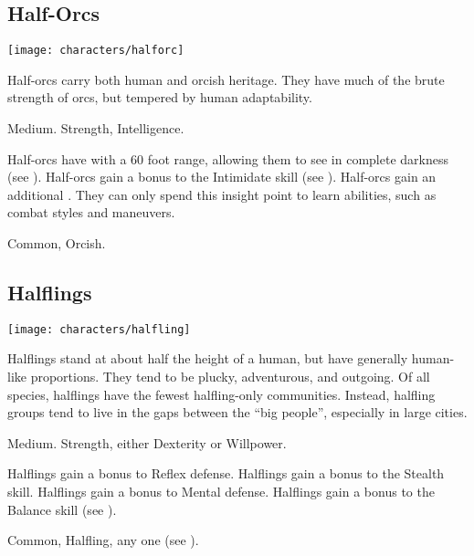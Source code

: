     \subsection{Half-Orcs}
        \texttt{[image: characters/halforc]}

        Half-orcs carry both human and orcish heritage.
        They have much of the brute strength of orcs, but tempered by human adaptability.

         Medium.
          Strength,  Intelligence.
        \begin{raggeditemize}
             Half-orcs have  with a 60 foot range, allowing them to see in complete darkness (see ).
             Half-orcs gain a  bonus to the Intimidate skill (see ).
             Half-orcs gain an additional .
                They can only spend this insight point to learn  abilities, such as combat styles and maneuvers.
        \end{raggeditemize}
         Common, Orcish.

    \subsection{Halflings}
        \texttt{[image: characters/halfling]}

        Halflings stand at about half the height of a human, but have generally human-like proportions.
        They tend to be plucky, adventurous, and outgoing.
        Of all species, halflings have the fewest halfling-only communities.
        Instead, halfling groups tend to live in the gaps between the ``big people'', especially in large cities.

         Medium.
          Strength, either  Dexterity or  Willpower.
        \begin{raggeditemize}
             Halflings gain a  bonus to Reflex defense.
             Halflings gain a  bonus to the Stealth skill.
             Halflings gain a  bonus to Mental defense.
             Halflings gain a  bonus to the Balance skill (see ).
        \end{raggeditemize}
         Common, Halfling, any one  (see ).

